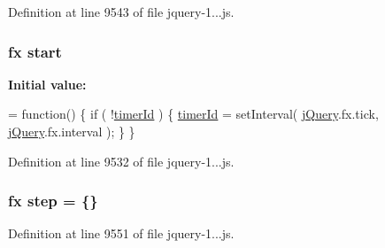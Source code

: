 Definition at line 9543 of file jquery-\/1...\+js.

\subsubsection[{\texorpdfstring{start}{start}}]{ {\bf fx} start}\hypertarget{_scripts_2jquery-1_810_82_8js_aef10902ffededd983608fdb8dbfc441a}{}\label{_scripts_2jquery-1_810_82_8js_aef10902ffededd983608fdb8dbfc441a}
{\bfseries Initial value\+:}
\begin{DoxyCode}
= \textcolor{keyword}{function}() \{
    \textcolor{keywordflow}{if} ( !\hyperlink{obj_2_release_2_package_2_package_tmp_2_scripts_2jquery-1_810_82_8js_aa447439fbe7027e58837a297297c9d8a}{timerId} ) \{
        \hyperlink{obj_2_release_2_package_2_package_tmp_2_scripts_2jquery-1_810_82_8js_aa447439fbe7027e58837a297297c9d8a}{timerId} = setInterval( \hyperlink{obj_2_release_2_package_2_package_tmp_2_scripts_2jquery-1_810_82_8js_a41c2e1bff4a6b292938143764e31d789}{jQuery}.fx.tick, \hyperlink{obj_2_release_2_package_2_package_tmp_2_scripts_2jquery-1_810_82_8js_a41c2e1bff4a6b292938143764e31d789}{jQuery}.fx.interval );
    \}
\}
\end{DoxyCode}


Definition at line 9532 of file jquery-\/1...\+js.

\subsubsection[{\texorpdfstring{step}{step}}]{ {\bf fx} step = \{\}}\hypertarget{_scripts_2jquery-1_810_82_8js_a7337229078e935a813e7e0f674fad739}{}\label{_scripts_2jquery-1_810_82_8js_a7337229078e935a813e7e0f674fad739}


Definition at line 9551 of file jquery-\/1...\+js.

